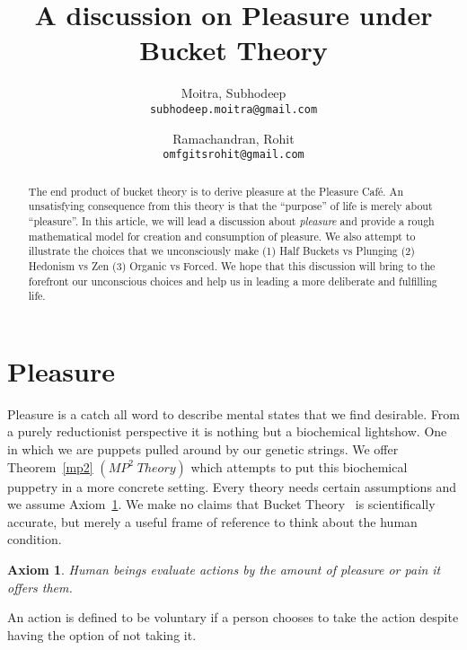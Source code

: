 \documentclass{article}
\newtheorem{axiom}[theorem]{Axiom}
\newenvironment{definition}[1][Definition]{\begin{trivlist}
\item[\hskip \labelsep {\bfseries #1}]}{\end{trivlist}}
\begin{document}
\title{A discussion on Pleasure under Bucket Theory}

\author{
	Moitra, Subhodeep \\ 
	{\tt subhodeep.moitra@gmail.com}
	\and
	Ramachandran, Rohit\\
	{\tt omfgitsrohit@gmail.com}
}

\maketitle

\begin{abstract}
The end product of bucket theory is to derive pleasure at the Pleasure Caf\'e. An unsatisfying consequence from this theory is that the ``purpose'' of life is merely about ``pleasure''. In this article, we will lead a discussion about \textit{pleasure} and provide a rough mathematical model for creation and consumption of pleasure. We also attempt to illustrate the choices that we unconsciously make (1) Half Buckets vs Plunging (2) Hedonism vs Zen (3) Organic vs Forced. We hope that this discussion will bring to the forefront our unconscious choices and help us in leading a more deliberate and fulfilling life. 
\end{abstract} 

\section{Pleasure}
Pleasure is a catch all word to describe mental states that we find desirable. From a purely reductionist perspective it is nothing but a biochemical lightshow. One in which we are puppets pulled around by our genetic strings. We offer Theorem~\ref{mp2} $(MP^2 \; Theory)$ which attempts to put this biochemical puppetry in a more concrete setting. Every theory needs certain assumptions and we assume Axiom~\ref{compare-actions}. We make no claims that Bucket Theory~\cite{Bucket2014} is scientifically accurate, but merely a useful frame of reference to think about the human condition.

\begin{axiom}
\label{compare-actions}
Human beings evaluate actions by the amount of pleasure or pain it offers them.
\end{axiom}

\begin{definition}
An action is defined to be voluntary if a person chooses to take the action despite having the option of not taking it.
\end{definition}
\end{document}
